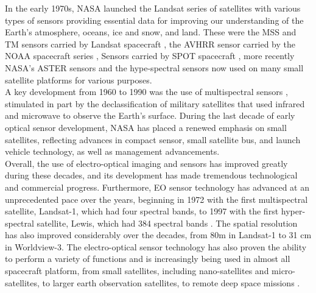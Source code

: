 \documentclass[final,5p,times,sort&compress,twocolumn]{elsarticle}
\begin{document}
In the early 1970s, NASA launched the Landsat series of satellites with various types of sensors providing essential data for improving our understanding of the Earth's atmosphere, oceans, ice and snow, and land. These were the MSS and TM sensors carried by Landsat spacecraft \cite{wulder2019current}, the AVHRR sensor carried by the NOAA spacecraft series \cite{oesterheld1998relation}, Sensors carried by SPOT spacecraft \cite{Tatem2008FiftyYO}, more recently NASA's ASTER sensors and the hype-spectral sensors \cite{prentice2021design} now used on many small satellite platforms for various purposes. \\
A key development from 1960 to 1990 was the use of multispectral sensors \cite{Tatem2008FiftyYO}, stimulated in part by the declassification of military satellites that used infrared and microwave to observe the Earth's surface. During the last decade of early optical sensor development, NASA has placed a renewed emphasis on small satellites, reflecting advances in compact sensor, small satellite bus, and launch vehicle technology, as well as management advancements.\\
Overall, the use of electro-optical imaging and sensors has improved greatly during these decades, and its development has made tremendous technological and commercial progress. Furthermore, EO sensor technology has advanced at an unprecedented pace over the years, beginning in 1972 with the first multispectral satellite, Landsat-1, which had four spectral bands, to 1997 with the first hyper-spectral satellite, Lewis, which had 384 spectral bands \cite{zhu2018review}. The spatial resolution has also improved considerably over the decades, from 80m in Landsat-1 to 31 cm in Worldview-3.  The electro-optical sensor technology has also proven the ability to perform a variety of functions and is increasingly being used in almost all spacecraft platform, from small satellites, including nano-satellites and micro-satellites, to larger earth observation satellites, to remote deep space missions \cite{chauhan2015hyperspectral}. 
\end{document}
